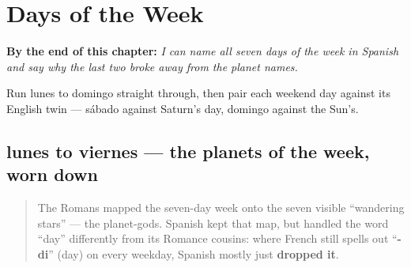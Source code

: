 
\chapter{Days of the Week}
\label{ch:spanish-days-of-the-week}

\begin{chapteropening}
\textbf{By the end of this chapter:} \emph{I can name all seven days of the week in Spanish and say why the last two broke away from the planet names.}

Run lunes to domingo straight through, then pair each weekend day against its English twin — sábado against Saturn's day, domingo against the Sun's.
\end{chapteropening}

\section[lunes, martes, miércoles, jueves …]{lunes to viernes — the planets of the week, worn down}

\label{lesson:ES-C21-lunes-viernes}



\begin{quote}
The Romans mapped the seven-day week onto the seven visible \textquotedblleft{}wandering stars\textquotedblright{} — the planet-gods. Spanish kept that map, but handled the word \textquotedblleft{}day\textquotedblright{} differently from its Romance cousins: where French still spells out \textquotedblleft{}\textbf{-di}\textquotedblright{} (day) on every weekday, Spanish mostly just \textbf{dropped it}.
\end{quote}

